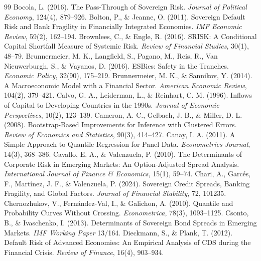 \begin{thebibliography}{99}
 Bocola, L. (2016). The Pass-Through of Sovereign Risk. \textit{Journal of Political Economy}, 124(4), 879--926.
 Bolton, P., \& Jeanne, O. (2011). Sovereign Default Risk and Bank Fragility in Financially Integrated Economies. \textit{IMF Economic Review}, 59(2), 162--194.
 Brownlees, C., \& Engle, R. (2016). SRISK: A Conditional Capital Shortfall Measure of Systemic Risk. \textit{Review of Financial Studies}, 30(1), 48--79.
 Brunnermeier, M. K., Langfield, S., Pagano, M., Reis, R., Van Nieuwerburgh, S., \& Vayanos, D. (2016). ESBies: Safety in the Tranches. \textit{Economic Policy}, 32(90), 175--219.
 Brunnermeier, M. K., \& Sannikov, Y. (2014). A Macroeconomic Model with a Financial Sector. \textit{American Economic Review}, 104(2), 379--421.
 Calvo, G. A., Leiderman, L., \& Reinhart, C. M. (1996). Inflows of Capital to Developing Countries in the 1990s. \textit{Journal of Economic Perspectives}, 10(2), 123--139.
 Cameron, A. C., Gelbach, J. B., \& Miller, D. L. (2008). Bootstrap-Based Improvements for Inference with Clustered Errors. \textit{Review of Economics and Statistics}, 90(3), 414--427.
 Canay, I. A. (2011). A Simple Approach to Quantile Regression for Panel Data. \textit{Econometrics Journal}, 14(3), 368--386.
 Cavallo, E. A., \& Valenzuela, P. (2010). The Determinants of Corporate Risk in Emerging Markets: An Option-Adjusted Spread Analysis. \textit{International Journal of Finance \& Economics}, 15(1), 59--74.
 Chari, A., Garcés, F., Martínez, J. F., \& Valenzuela, P. (2024). Sovereign Credit Spreads, Banking Fragility, and Global Factors. \textit{Journal of Financial Stability}, 72, 101235.
 Chernozhukov, V., Fernández-Val, I., \& Galichon, A. (2010). Quantile and Probability Curves Without Crossing. \textit{Econometrica}, 78(3), 1093--1125.
 Csonto, B., \& Ivaschenko, I. (2013). Determinants of Sovereign Bond Spreads in Emerging Markets. \textit{IMF Working Paper} 13/164.
 Dieckmann, S., \& Plank, T. (2012). Default Risk of Advanced Economies: An Empirical Analysis of CDS during the Financial Crisis. \textit{Review of Finance}, 16(4), 903--934.

\end{thebibliography}
